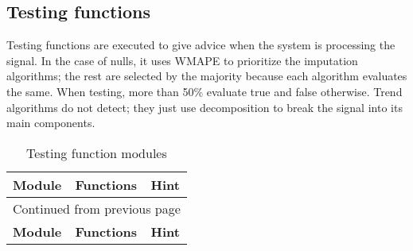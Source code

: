 \documentclass[a4paper]{article}
\begin{document}
\subsection{Testing functions}
\label{sec:org0b42990}

Testing functions are executed to give advice when the system is processing the signal. In the case of nulls, it uses WMAPE to prioritize the imputation algorithms; the rest are selected by the majority because each algorithm evaluates the same. When testing, more than 50\% evaluate true and false otherwise. Trend algorithms do not detect; they just use decomposition to break the signal into its main components.

\begin{longtable}{lll}
\caption{Testing function modules}
\\[0pt]
\textbf{Module} & \textbf{Functions} & \textbf{Hint}\\[0pt]
\hline
\endfirsthead
\multicolumn{3}{l}{Continued from previous page} \\[0pt]
\hline

\textbf{Module} & \textbf{Functions} & \textbf{Hint} \\[0pt]


\end{longtable}
\end{document}

